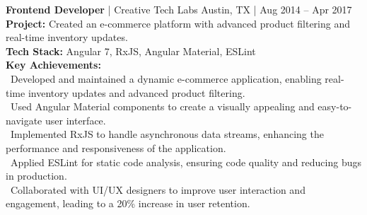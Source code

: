 {\textbf{Frontend Developer} | Creative Tech Labs \hfill Austin, TX | Aug 2014 – Apr 2017} \\
\textbf{Project:} Created an e-commerce platform with advanced product filtering and real-time inventory updates. \\
\textbf{Tech Stack:} Angular 7, RxJS, Angular Material, ESLint \\
\textbf{Key Achievements:} \\[4pt]
\hspace*{4pt} \textbullet~Developed and maintained a dynamic e-commerce application, enabling real-time inventory updates and advanced product filtering. \\
\hspace*{4pt} \textbullet~Used Angular Material components to create a visually appealing and easy-to-navigate user interface. \\
\hspace*{4pt} \textbullet~Implemented RxJS to handle asynchronous data streams, enhancing the performance and responsiveness of the application. \\
\hspace*{4pt} \textbullet~Applied ESLint for static code analysis, ensuring code quality and reducing bugs in production. \\
\hspace*{4pt} \textbullet~Collaborated with UI/UX designers to improve user interaction and engagement, leading to a 20\% increase in user retention. \\
